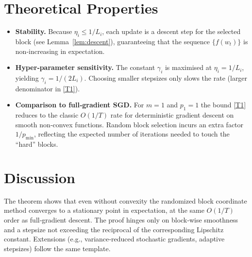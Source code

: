 \documentclass{article}
\begin{document}
\section*{Theoretical Properties}
\begin{itemize}
\item \textbf{Stability.} Because $\eta_i\le 1/L_i$, each update is a descent step for the selected block (see Lemma~\ref{lem:descent}), guaranteeing that the sequence $\{f(w_t)\}$ is non‑increasing in expectation.
\item \textbf{Hyper‑parameter sensitivity.} The constant $\gamma_i$ is maximised at $\eta_i=1/L_i$, yielding $\gamma_i=1/(2L_i)$. Choosing smaller stepsizes only slows the rate (larger denominator in \eqref{T1}).
\item \textbf{Comparison to full‑gradient SGD.} For $m=1$ and $p_1=1$ the bound \eqref{T1} reduces to the classic $O(1/T)$ rate for deterministic gradient descent on smooth non‑convex functions. Random block selection incurs an extra factor $1/p_{\min}$, reflecting the expected number of iterations needed to touch the “hard” blocks.
\end{itemize}

\section*{Discussion}
The theorem shows that even without convexity the randomized block coordinate method converges to a stationary point in expectation, at the same $O(1/T)$ order as full‑gradient descent. The proof hinges only on block‑wise smoothness and a stepsize not exceeding the reciprocal of the corresponding Lipschitz constant. Extensions (e.g., variance‑reduced stochastic gradients, adaptive stepsizes) follow the same template.

\newpage
\end{document}

